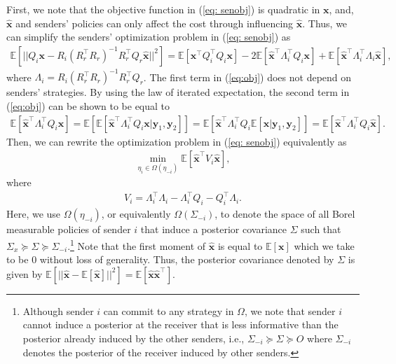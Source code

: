 \documentclass[12pt,journal,onecolumn]{IEEEtran}
\begin{document}
First, we note that the objective function in (\ref{eq: senobj}) is quadratic in $\boldsymbol{x}$, and, $\hat{\boldsymbol{x}}$ and senders' policies can only affect the cost through influencing $\hat{\boldsymbol{x}}$. Thus, we can simplify the senders' optimization problem in (\ref{eq: senobj}) as
\begin{align}\label{eq:obj}
    \mathbb{E}[||Q_i\boldsymbol{x}-R_i(R_r^\top R_r)^{-1}R_r^\top Q_r\hat{\boldsymbol{x}}||^2]=\mathbb{E}[\boldsymbol{x}^\top Q_i^\top Q_i\boldsymbol{x}]-2\mathbb{E}[\hat{\boldsymbol{x}}^\top\Lambda_i^\top Q_i\boldsymbol{x}]+\mathbb{E}[\hat{\boldsymbol{x}}^\top\Lambda_i^\top\Lambda_i\hat{\boldsymbol{x}}],
\end{align}
where $\Lambda_i=R_i(R_r^\top R_r)^{-1}R_r^\top Q_r$. The first term in (\ref{eq:obj}) does not depend on senders' strategies. By using the law of iterated expectation, the second term in (\ref{eq:obj}) can be shown to be equal to
\begin{align*}
    \mathbb{E}[\hat{\boldsymbol{x}}^\top\Lambda_i^\top Q_i\boldsymbol{x}]=\mathbb{E}[\mathbb{E}[\hat{\boldsymbol{x}}^\top\Lambda_i^\top Q_i\boldsymbol{x}|\boldsymbol{y}_1,\boldsymbol{y}_2]]=\mathbb{E}[\hat{\boldsymbol{x}}^\top\Lambda_i^\top Q_i\mathbb{E}[\boldsymbol{x}|\boldsymbol{y}_1,\boldsymbol{y}_2]]=\mathbb{E}[\hat{\boldsymbol{x}}^\top\Lambda_i^\top Q_i\hat{\boldsymbol{x}}].
\end{align*}
Then, we can rewrite the optimization problem in (\ref{eq: senobj}) equivalently as
\begin{align}\label{eq:senobj_v2}
    \min_{\eta_i\in \Omega(\eta_{-i})}\mathbb{E}[\hat{\boldsymbol{x}}^\top V_i\hat{\boldsymbol{x}}],
\end{align}
where
\begin{align}\label{eqn:Vi}
V_i=\Lambda_i^\top\Lambda_i-\Lambda_i^\top Q_i-Q_i^\top\Lambda_i.
\end{align}
Here, we use $\Omega(\eta_{-i})$, or equivalently $\Omega(\Sigma_{-i})$, to denote the space of all Borel measurable policies of sender $i$ that induce a posterior covariance $\Sigma$ such that $\Sigma_x\succeq \Sigma \succeq \Sigma_{-i}$.\footnote{Although sender $i$ can commit to any strategy in $\Omega$, we note that sender $i$ cannot induce a posterior at the receiver that is less informative than the posterior already induced by the other senders, i.e., $\Sigma_{-i}\succeq\Sigma \succeq O$ where $\Sigma_{-i}$ denotes the posterior of the receiver induced by other senders.} Note that the first moment of $\hat{\boldsymbol{x}}$ is equal to $\mathbb{E}[\boldsymbol{x}]$ which we take to be 0 without loss of generality. Thus, the posterior covariance denoted by $\Sigma$ is given by $\mathbb{E}[||\hat{\boldsymbol{x}}-\mathbb{E}[\hat{\boldsymbol{x}}]||^2]=\mathbb{E}[\hat{\boldsymbol{x}}\hat{\boldsymbol{x}}^\top]$. 
\end{document}
